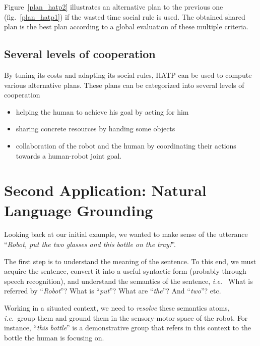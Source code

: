 \documentclass{svmult}
\newcommand{\ie}{{\textit{i.e.~}}}
\begin{document}
Figure~\ref{plan_hatp2} illustrates an alternative plan to the previous 
one (fig.~\ref{plan_hatp1}) if the wasted time social rule is used.
The obtained shared plan is the best plan according to a global evaluation of
these multiple criteria.

\subsection*{Several levels of cooperation} 

By tuning its costs and adapting its social rules, HATP can be used to compute
various alternative plans. These plans can be categorized into several levels
of cooperation

\begin{itemize}
\item helping the human to achieve his goal by acting for him
\item sharing concrete resources by handing some objects
\item collaboration of the robot and the human by coordinating their
  actions towards a human-robot joint goal.
\end{itemize}




\section{Second Application: Natural Language Grounding}
\label{dialogs}

Looking back at our initial example, we wanted to make sense of the utterance
``\emph{Robot, put the two glasses and this bottle on the tray!}''.

The first step is to understand the meaning of the sentence. To this end, we
must acquire the sentence, convert it into a useful syntactic form (probably
through speech recognition), and understand the semantics of the sentence, \ie
What is referred by ``\textit{Robot}''? What is ``\textit{put}''? What are
``\textit{the}''? And ``\textit{two}''? etc.

Working in a situated context, we need to \emph{resolve} these semantics atoms,
\ie group them and ground them in the sensory-motor space of the robot. For instance,
``\textit{this bottle}'' is a demonstrative group that refers in this context to the
bottle the human is focusing on.
\end{document}
